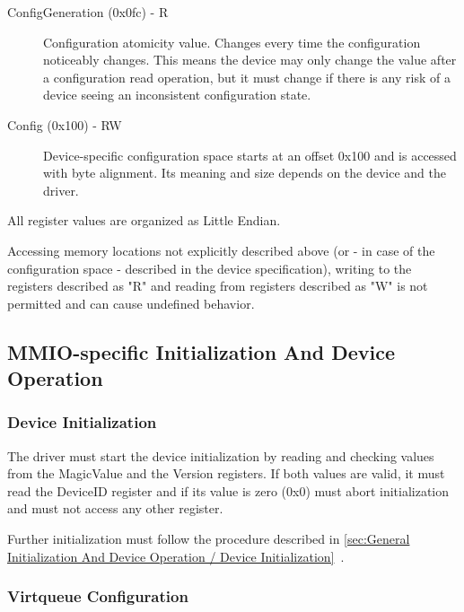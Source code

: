 \begin{description}
\item[ConfigGeneration (0x0fc) - R]
  Configuration atomicity value.
  Changes every time the configuration noticeably changes. This
  means the device may only change the value after a configuration
  read operation, but it must change if there is any risk of a
  device seeing an inconsistent configuration state.

\item[Config (0x100) - RW]
  Device-specific configuration space starts at an offset 0x100
  and is accessed with byte alignment. Its meaning and size
  depends on the device and the driver.
\end{description}

All register values are organized as Little Endian.

Accessing memory locations not explicitly described above (or
- in case of the configuration space - described in the device
specification), writing to the registers described as "R" and
reading from registers described as "W" is not permitted and
can cause undefined behavior.

\subsection{MMIO-specific Initialization And Device Operation}\label{sec:Virtio Transport Options / Virtio Over MMIO / MMIO-specific Initialization And Device Operation}

\subsubsection{Device Initialization}\label{sec:Virtio Transport Options / Virtio Over MMIO / MMIO-specific Initialization And Device Operation / Device Initialization}

The driver must start the device initialization by reading and
checking values from the MagicValue and the Version registers.
If both values are valid, it must read the DeviceID register
and if its value is zero (0x0) must abort initialization and
must not access any other register.

Further initialization must follow the procedure described in
\ref{sec:General Initialization And Device Operation / Device Initialization}~.

\subsubsection{Virtqueue Configuration}\label{sec:Virtio Transport Options / Virtio Over MMIO / MMIO-specific Initialization And Device Operation / Virtqueue Configuration}

